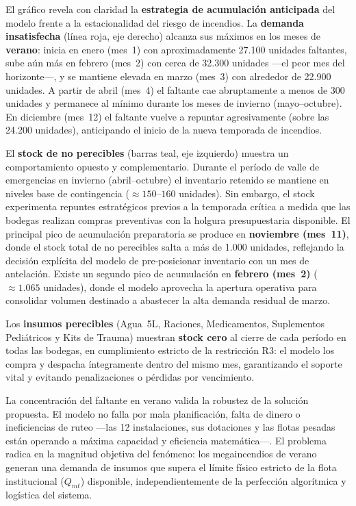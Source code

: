 \documentclass[letterpaper]{article}
\begin{document}
El gráfico revela con claridad la \textbf{estrategia de acumulación anticipada}
del modelo frente a la estacionalidad del riesgo de incendios. La \textbf{demanda insatisfecha} (línea roja, eje derecho) alcanza sus máximos
en los meses de \textbf{verano}: inicia en enero (mes~1) con aproximadamente
27.100 unidades faltantes, sube aún más en febrero (mes~2) con cerca de
32.300 unidades —el peor mes del horizonte—, y se mantiene elevada en
marzo (mes~3) con alrededor de 22.900 unidades. A partir de abril (mes~4)
el faltante cae abruptamente a menos de 300 unidades y permanece
al mínimo durante los meses de invierno (mayo--octubre). En diciembre (mes~12) el faltante vuelve a repuntar agresivamente (sobre las 24.200 unidades), anticipando el inicio
de la nueva temporada de incendios.

El \textbf{stock de no perecibles} (barras teal, eje izquierdo) muestra un
comportamiento opuesto y complementario. Durante el período de valle de emergencias en invierno
(abril--octubre) el inventario retenido se mantiene en niveles base de contingencia ($\approx 150$--$160$ unidades). Sin embargo, el stock experimenta repuntes estratégicos previos a la temporada crítica a medida que las
bodegas realizan compras preventivas con la holgura presupuestaria disponible. El principal pico de acumulación preparatoria se produce en \textbf{noviembre (mes~11)}, donde el
stock total de no perecibles salta a más de 1.000 unidades, reflejando la decisión explícita del
modelo de pre-posicionar inventario con un mes de antelación. Existe un segundo pico de acumulación en \textbf{febrero (mes~2)} ($\approx 1.065$ unidades), donde el modelo aprovecha la apertura operativa para consolidar volumen destinado a abastecer la alta demanda residual de marzo.

Los \textbf{insumos perecibles} (Agua~5L, Raciones, Medicamentos, Suplementos Pediátricos y Kits de Trauma)
muestran \textbf{stock cero} al cierre de cada período en todas las bodegas, en
cumplimiento estricto de la restricción R3: el modelo los compra y despacha íntegramente
dentro del mismo mes, garantizando el soporte vital y evitando penalizaciones o pérdidas por vencimiento.

La concentración del faltante en verano valida la robustez de la solución propuesta. El modelo no falla por mala
planificación, falta de dinero o ineficiencias de ruteo —las 12 instalaciones, sus dotaciones y las flotas pesadas 
están operando a máxima capacidad y eficiencia matemática—. El problema radica en la magnitud objetiva del fenómeno:
los megaincendios de verano generan una demanda de insumos que supera el límite físico estricto de la flota institucional ($Q_{mt}$)
disponible, independientemente de la perfección algorítmica y logística del sistema.
\end{document}
